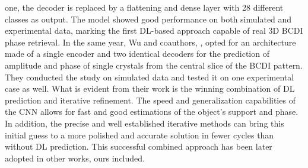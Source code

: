 one, the decoder is replaced by a flattening and dense layer with 28 different classes as output. The model showed good performance
on both simulated and experimental data, marking the first DL-based approach capable of real 3D BCDI phase retrieval.
In the same year, Wu and coauthors, \cite{Wu2021}, opted for an architecture made of a single encoder and two identical decoders for the prediction of 
amplitude and phase of single crystals from the central slice of the BCDI pattern. They conducted the study on simulated 
data and tested it on one experimental case as well. What is evident from their work is the winning combination of DL prediction
and iterative refinement. The speed and generalization capabilities of the CNN allows for fast and good estimations of the 
object's support and phase. In addition, the precise and well established iterative methods can bring this initial guess to a 
more polished and accurate solution in fewer cycles than without DL prediction. This successful combined approach has been 
later adopted in other works, ours included. 

